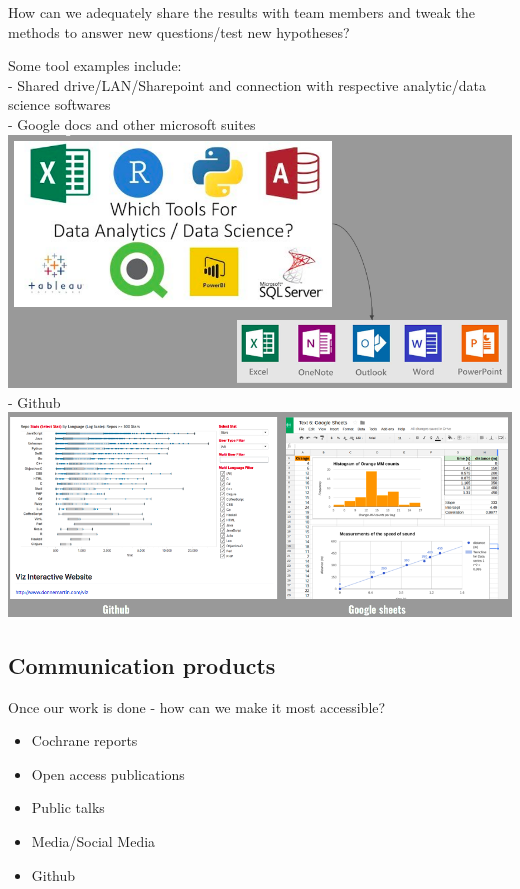 \documentclass[
]{book}
\providecommand{\tightlist}{%
  \setlength{\itemsep}{0pt}\setlength{\parskip}{0pt}}
\begin{document}
How can we adequately share the results with team members and tweak the methods to answer new questions/test new hypotheses?

Some tool examples include:\\
- Shared drive/LAN/Sharepoint and connection with respective analytic/data science softwares\\
- Google docs and other microsoft suites\\
\includegraphics{rr-presentation-figure/results1.png}
- Github\\
\includegraphics{rr-presentation-figure/results2.png}

\hypertarget{communication-products}{%
\subsection{Communication products}\label{communication-products}}

Once our work is done - how can we make it most accessible?

\begin{itemize}
\tightlist
\item
  Cochrane reports\\
\item
  Open access publications\\
\item
  Public talks\\
\item
  Media/Social Media\\
\item
  Github
\end{itemize}
\end{document}
